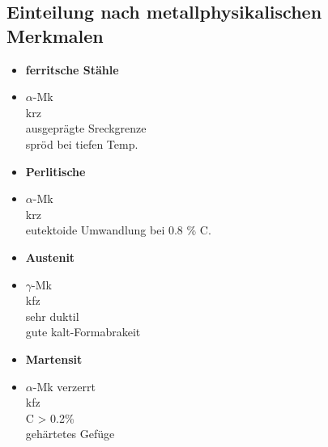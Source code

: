 \documentclass[8.5pt,twocolumn]{extarticle}
\begin{document}
    \subsection{Einteilung nach metallphysikalischen Merkmalen}
    \begin{minipage}[t]{0.5\columnwidth}
        \begin{itemize}[label={}, leftmargin=*, itemsep=0.01em]
            \item \textbf{ferritsche Stähle}
            \item $\alpha$-Mk \\ krz \\ ausgeprägte Sreckgrenze \\ spröd bei tiefen Temp.
        \end{itemize}
    \end{minipage}\hfill
    \begin{minipage}[t]{0.5\columnwidth}
        \begin{itemize}[label={}, leftmargin=*,  itemsep=0.01em]
            \item \textbf{Perlitische}
            \item $\alpha$-Mk \\ krz \\ eutektoide Umwandlung bei 0.8 \% C.
        \end{itemize}
    \end{minipage}
    \begin{minipage}[t]{0.5\columnwidth}
        \begin{itemize}[label={}, leftmargin=*, itemsep=0.01em]
            \item \textbf{Austenit}
            \item $\gamma$-Mk \\ kfz \\ sehr duktil \\ gute kalt-Formabrakeit
        \end{itemize}
    \end{minipage}\hfill
    \begin{minipage}[t]{0.5\columnwidth}
        \begin{itemize}[label={}, leftmargin=*,  itemsep=0.01em]
            \item \textbf{Martensit}
            \item $\alpha$-Mk verzerrt \\ kfz \\ C > 0.2\% \\ gehärtetes Gefüge
        \end{itemize} 
    \end{minipage}\hfill
\end{document}
